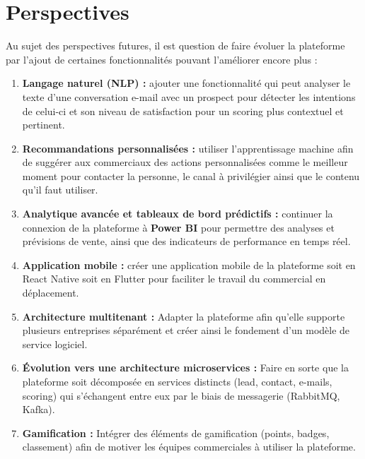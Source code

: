 \section*{Perspectives}

Au sujet des perspectives futures, il est question de faire évoluer la plateforme par l'ajout de certaines fonctionnalités pouvant l'améliorer encore plus :

\begin{enumerate}
    \item \textbf{Langage naturel (NLP) :} ajouter une fonctionnalité qui peut analyser le texte d'une conversation e-mail avec un prospect pour détecter les intentions de celui-ci et son niveau de satisfaction pour un scoring plus contextuel et pertinent.

    \item \textbf{Recommandations personnalisées :} utiliser l'apprentissage machine afin de suggérer aux commerciaux des actions personnalisées comme le meilleur moment pour contacter la personne, le canal à privilégier ainsi que le contenu qu'il faut utiliser.

    \item \textbf{Analytique avancée et tableaux de bord prédictifs :} continuer la connexion de la plateforme à \textbf{Power BI} pour permettre des analyses et prévisions de vente, ainsi que des indicateurs de performance en temps réel.

    \item \textbf{Application mobile :} créer une application mobile de la plateforme soit en React Native soit en Flutter pour faciliter le travail du commercial en déplacement.

    \item \textbf{Architecture multitenant :} Adapter la plateforme afin qu'elle supporte plusieurs entreprises séparément et créer ainsi le fondement d'un modèle de service logiciel.

    \item \textbf{Évolution vers une architecture microservices :} Faire en sorte que la plateforme soit décomposée en services distincts (lead, contact, e-mails, scoring) qui s'échangent entre eux par le biais de messagerie (RabbitMQ, Kafka).

    \item \textbf{Gamification :} Intégrer des éléments de gamification (points, badges, classement) afin de motiver les équipes commerciales à utiliser la plateforme.
\end{enumerate}

